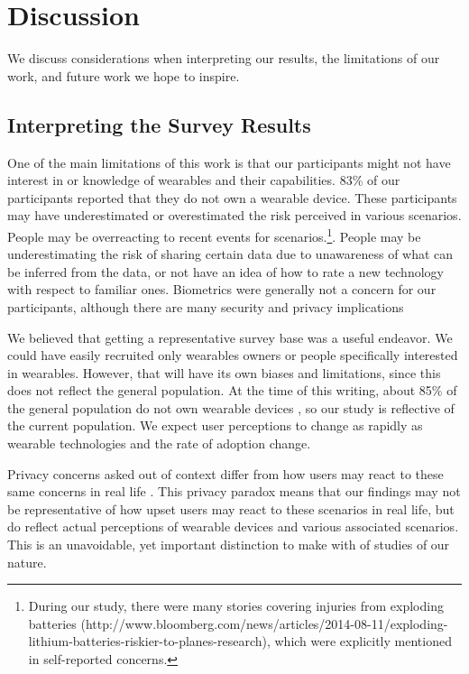 
\section{Discussion}
We discuss considerations when interpreting our results, the limitations of our work, and future work we hope to inspire. 

\subsection{Interpreting the Survey Results}
One of the main limitations of this work is that our participants might not have interest in or knowledge of wearables and their capabilities. 83\% of our participants reported that they do not own a wearable device. These participants may have underestimated or overestimated the risk perceived in various scenarios. People may be overreacting to recent events for scenarios.\footnote{During our study, there were many stories covering injuries from exploding batteries (http://www.bloomberg.com/news/articles/2014-08-11/exploding-lithium-batteries-riskier-to-planes-research), which were explicitly mentioned in self-reported concerns.}. People may be underestimating the risk of sharing certain data due to unawareness of what can be inferred from the data, or not have an idea of how to rate a new technology with respect to familiar ones. Biometrics were generally not a concern for our participants, although there are many security and privacy implications \cite{prabhakar2003biometric}

We believed that getting a representative survey base was a useful endeavor. We could have easily recruited only wearables owners or people specifically interested in wearables. However, that will have its own biases and limitations, since this does not reflect the general population. At the time of this writing, about 85\% of the general population do not own wearable devices \cite{Nilsen,WearableStatNews}, so our study is reflective of the current population. We expect user perceptions to change as rapidly as wearable technologies and the rate of adoption change. 

Privacy concerns asked out of context differ from how users may react to these same concerns in real life \cite{norberg2007privacy, jensen2005privacy}. This privacy paradox means that our findings may not be representative of how upset users may react to these scenarios in real life, but do reflect actual perceptions of wearable devices and various associated scenarios. This is an unavoidable, yet important distinction to make with of studies of our nature.

